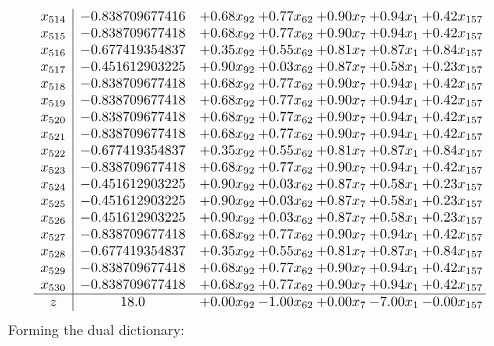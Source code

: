 \documentclass[8pt]{article}
\begin{document}
\[\begin{array}{c| c c@{\hskip 2pt} c@{\hskip 2pt} c@{\hskip 2pt} c@{\hskip 2pt} c@{\hskip 2pt} }
 x_{514}   &  -0.838709677416 & +  0.68 x_{92} & +  0.77 x_{62} & +  0.90 x_{7} & +  0.94 x_{1} & +  0.42 x_{157}\\
 x_{515}   &  -0.838709677418 & +  0.68 x_{92} & +  0.77 x_{62} & +  0.90 x_{7} & +  0.94 x_{1} & +  0.42 x_{157}\\
 x_{516}   &  -0.677419354837 & +  0.35 x_{92} & +  0.55 x_{62} & +  0.81 x_{7} & +  0.87 x_{1} & +  0.84 x_{157}\\
 x_{517}   &  -0.451612903225 & +  0.90 x_{92} & +  0.03 x_{62} & +  0.87 x_{7} & +  0.58 x_{1} & +  0.23 x_{157}\\
 x_{518}   &  -0.838709677418 & +  0.68 x_{92} & +  0.77 x_{62} & +  0.90 x_{7} & +  0.94 x_{1} & +  0.42 x_{157}\\
 x_{519}   &  -0.838709677418 & +  0.68 x_{92} & +  0.77 x_{62} & +  0.90 x_{7} & +  0.94 x_{1} & +  0.42 x_{157}\\
 x_{520}   &  -0.838709677418 & +  0.68 x_{92} & +  0.77 x_{62} & +  0.90 x_{7} & +  0.94 x_{1} & +  0.42 x_{157}\\
 x_{521}   &  -0.838709677418 & +  0.68 x_{92} & +  0.77 x_{62} & +  0.90 x_{7} & +  0.94 x_{1} & +  0.42 x_{157}\\
 x_{522}   &  -0.677419354837 & +  0.35 x_{92} & +  0.55 x_{62} & +  0.81 x_{7} & +  0.87 x_{1} & +  0.84 x_{157}\\
 x_{523}   &  -0.838709677418 & +  0.68 x_{92} & +  0.77 x_{62} & +  0.90 x_{7} & +  0.94 x_{1} & +  0.42 x_{157}\\
 x_{524}   &  -0.451612903225 & +  0.90 x_{92} & +  0.03 x_{62} & +  0.87 x_{7} & +  0.58 x_{1} & +  0.23 x_{157}\\
 x_{525}   &  -0.451612903225 & +  0.90 x_{92} & +  0.03 x_{62} & +  0.87 x_{7} & +  0.58 x_{1} & +  0.23 x_{157}\\
 x_{526}   &  -0.451612903225 & +  0.90 x_{92} & +  0.03 x_{62} & +  0.87 x_{7} & +  0.58 x_{1} & +  0.23 x_{157}\\
 x_{527}   &  -0.838709677418 & +  0.68 x_{92} & +  0.77 x_{62} & +  0.90 x_{7} & +  0.94 x_{1} & +  0.42 x_{157}\\
 x_{528}   &  -0.677419354837 & +  0.35 x_{92} & +  0.55 x_{62} & +  0.81 x_{7} & +  0.87 x_{1} & +  0.84 x_{157}\\
 x_{529}   &  -0.838709677418 & +  0.68 x_{92} & +  0.77 x_{62} & +  0.90 x_{7} & +  0.94 x_{1} & +  0.42 x_{157}\\
 x_{530}   &  -0.838709677418 & +  0.68 x_{92} & +  0.77 x_{62} & +  0.90 x_{7} & +  0.94 x_{1} & +  0.42 x_{157}\\
\hline
z    &  18.0 & +  0.00 x_{92} & -1.00 x_{62} & +  0.00 x_{7} & -7.00 x_{1} & -0.00 x_{157}\\
\end{array}\]
Forming the dual dictionary:
\end{document}
